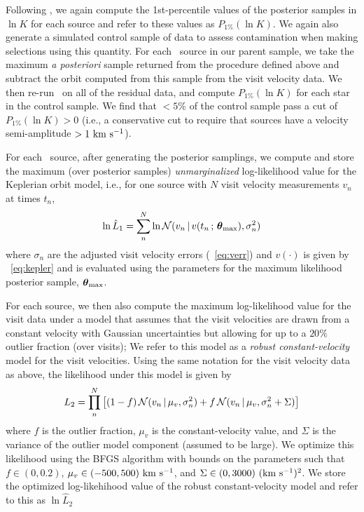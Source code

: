 \documentclass[modern]{aastex63}
\begin{document}
Following \citet{Price-Whelan:2018}, we again compute the 1st-percentile values
of the posterior samples in $\ln K$ for each source and refer to these values as
$P_{1\%}(\ln K)$.
We again also generate a simulated control sample of data to assess
contamination when making selections using this quantity.
For each \apogee\ source in our parent sample, we take the maximum \textsl{a
posteriori} sample returned from the procedure defined above and subtract the
orbit computed from this sample from the visit velocity data.
We then re-run \thejoker\ on all of the residual data, and compute $P_{1\%}(\ln
K)$ for each star in the control sample.
We find that $<5\%$ of the control sample pass a cut of $P_{1\%}(\ln K) > 0$
(i.e., a conservative cut to require that sources have a velocity semi-amplitude
$> 1~\mathrm{km}~\mathrm{s}^{-1}$).

For each \apogee\ source, after generating the posterior samplings, we compute
and store the maximum (over posterior samples) \emph{unmarginalized}
log-likelihood value for the Keplerian orbit model, i.e., for one source with
$N$ visit velocity measurements $v_n$ at times $t_n$,
\begin{equation}
    \ln \hat{L}_1 = \sum_n^N \ln \mathcal{N}(v_n \given
        v(t_n \,;\, \bs{\theta}_{\mathrm{max}}), \sigma_n^2)
\end{equation}
where $\sigma_n$ are the adjusted visit velocity errors
(\equationname~\ref{eq:verr}) and $v(\cdot)$ is given by
\equationname~\ref{eq:kepler} and is evaluated using the parameters for the
maximum likelihood posterior sample, $\boldsymbol{\theta}_{\mathrm{max}}$.

For each source, we then also compute the maximum log-likelihood value for the
visit data under a model that assumes that the visit velocities are drawn from a
constant velocity with Gaussian uncertainties but allowing for up to a $20\%$
outlier fraction (over visits); We refer to this model as a \emph{robust
constant-velocity} model for the visit velocities.
Using the same notation for the visit velocity data as above, the likelihood
under this model is given by
\begin{equation}
    L_2 = \prod_n^N \left[(1-f) \, \mathcal{N}(v_n \given \mu_v, \sigma_n^2)
        + f\, \mathcal{N}(v_n \given \mu_v, \sigma_n^2 + \Sigma) \right]
\end{equation}
where $f$ is the outlier fraction, $\mu_v$ is the constant-velocity value, and
$\Sigma$ is the variance of the outlier model component (assumed to be large).
We optimize this likelihood using the BFGS algorithm \citep{Nocedal:2006} with
bounds on the parameters such that $f \in (0, 0.2)$, $\mu_v \in (-500,
500)~\mathrm{km}~\mathrm{s}^{-1}$, and $\Sigma \in (0, 3000)~(\mathrm{km}~\mathrm{s}^{-1})^2$.
We store the optimized log-likehihood value of the robust constant-velocity
model and refer to this as $\ln \hat{L}_2$
\end{document}
